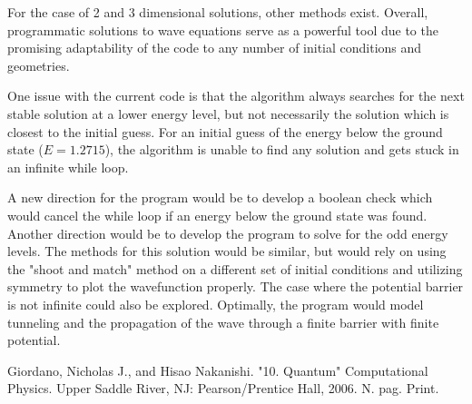 \documentclass[12pt]{article}                  %
\begin{document}
For the case of 2 and 3 dimensional solutions, other methods exist. Overall, programmatic solutions to wave equations serve as a powerful tool due to the promising adaptability of the code to any number of initial conditions and geometries. 

\pagebreak
	
One issue with the current code is that the algorithm always searches for the next stable solution at a lower energy level, but not necessarily the solution which is closest to the initial guess. For an initial guess of the energy below the ground state ($E = 1.2715$), the algorithm is unable to find any solution and gets stuck in an infinite while loop. 

A new direction for the program would be to develop a boolean check which would cancel the while loop if an energy below the ground state was found. Another direction would be to develop the program to solve for the odd energy levels. The methods for this solution would be similar, but would rely on using the "shoot and match" method on a different set of initial conditions and utilizing symmetry to plot the wavefunction properly. The case where the potential barrier is not infinite could also be explored. Optimally, the program would model tunneling and the propagation of the wave through a finite barrier with finite potential. 


\begin{thebibliography}{9}

Giordano, Nicholas J., and Hisao Nakanishi. "10. Quantum" Computational Physics. Upper Saddle River, NJ: Pearson/Prentice Hall, 2006. N. pag. Print.


\end{thebibliography}

\pagebreak
\end{document}
